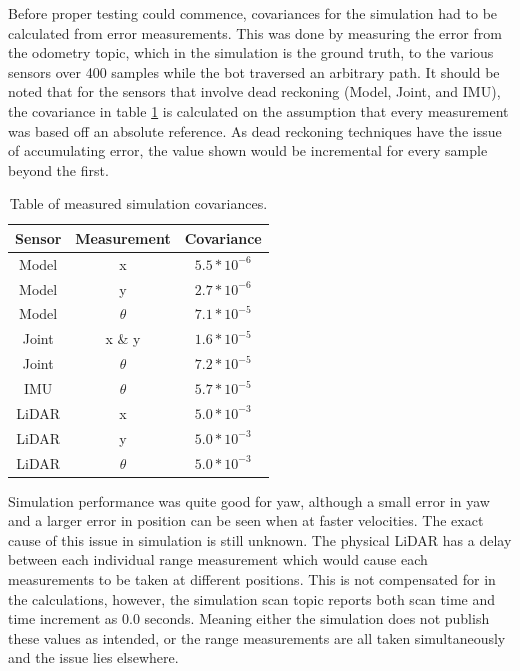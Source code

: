 	Before proper testing could commence, covariances for the simulation had to be calculated from error measurements. This was done by measuring the error from the odometry topic, which in the simulation is the ground truth, to the various sensors over 400 samples while the bot traversed an arbitrary path. It should be noted that for the sensors that involve dead reckoning (Model, Joint, and IMU), the covariance in table \ref{tab:1} is calculated on the assumption that every measurement was based off an absolute reference. As dead reckoning techniques have the issue of accumulating error, the value shown would be incremental for every sample beyond the first.\par
	\begin{table}
	\centering
	\caption{Table of measured simulation covariances.}
	\label{tab:1}
	\begin{tabular}{ccc}
		\hline
		Sensor	&Measurement	&Covariance		\\\hline\hline
		Model		&x 			&$5.5*10^{-6}$	\\
		Model		&y			&$2.7*10^{-6}$	\\
		Model		&$\theta$		&$7.1*10^{-5}$	\\\hline\hline
		Joint		&x \& y		&$1.6*10^{-5}$	\\
		Joint		&$\theta$		&$7.2*10^{-5}$	\\\hline\hline
		IMU		&$\theta$		&$5.7*10^{-5}$	\\\hline\hline
		LiDAR		&x 			&$5.0*10^{-3}$	\\
		LiDAR		&y			&$5.0*10^{-3}$	\\
		LiDAR		&$\theta$		&$5.0*10^{-3}$	\\\hline
	\end{tabular}
	\end{table}
	
	Simulation performance was quite good for yaw, although a small error in yaw and a larger error in position can be seen when at faster velocities. The exact cause of this issue in simulation is still unknown. The physical LiDAR has a delay between each individual range measurement which would cause each measurements to be taken at different positions. This is not compensated for in the calculations, however, the simulation scan topic reports both scan time and time increment as 0.0 seconds. Meaning either the simulation does not publish these values as intended, or the range measurements are all taken simultaneously and the issue lies elsewhere.\par
	
